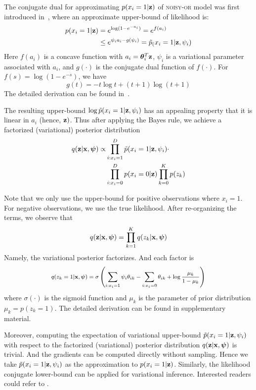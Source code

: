 The conjugate dual for approximating $p(x_i=1|\mathbf{z})$ of \textsc{noisy-or} model was first introduced in~\citep{jaakkola1999variational}, where an approximate upper-bound of likelihood is:
\begin{align}
    p(x_i=1|\mathbf{z}) & =e^{\log (1-e^{-a_i})} = e^{f(a_i)} \nonumber \\
   &  \leq e^{\psi_i a_i - g(\psi_i)} = \Tilde{p}_(x_i=1|\mathbf{z}, \psi_i) 
\label{eq:positiveUB}    
\end{align}
Here $f(a_i)$ is a concave function with $a_i = \bm{\theta}_i^T\mathbf{z}$, $\psi_i$ is a variational parameter associated with $a_i$, and $g(\cdot)$ is the conjugate dual function of $f(\cdot)$. For $f(s) = \log(1-e^{-s})$, we have
\begin{equation}
g(t)  =  -t\log t + (t+1)\log (t+1)
\end{equation}
The detailed derivation can be found in~\citep{jaakkola1999variational}.


The resulting upper-bound $\log \Tilde{p}(x_i=1|\mathbf{z}, \psi_i)$ has an appealing property that it is linear in $a_i$ (hence, $\mathbf{z})$. Thus after applying the Bayes rule, we achieve a factorized (variational) posterior distribution
\begin{align}
    q(\mathbf{z}|\mathbf{x}, \bm{\psi})  \propto 
     &\prod_{i: x_i =1}^D\Tilde{p}(x_i=1|\mathbf{z}, \psi_i) \cdot \nonumber \\
     &\prod_{i: x_i=0}^Dp(x_i=0|\mathbf{z})\prod_{k=0}^K p(z_k)
\label{eq: lvi posterior}
\end{align}


Note that we only use the upper-bound for positive observations where $x_i=1$. For negative observations, we use the true likelihood.  After re-organizing the terms, we observe that
\begin{align}
    q(\mathbf{z}|\mathbf{x}, \bm{\psi}) = \prod_{k=1}^K q(z_k |\mathbf{x}, \bm{\psi})
\end{align}
Namely, the variational posterior factorizes. And each factor is
\begin{align}
    \medmath{q(z_k=1 |\bx, \bpsi) = 
    \sigma\left(\sum_{i:x_i=1}\psi_i\theta_{ik} - \sum_{i:x_i=0}\theta_{ik} + \log \frac{\mu_k}{1-\mu_k}\right)}
\label{eq:factorizedposterior}
\end{align}
where $\sigma(\cdot)$ is the sigmoid function and $\mu_k$ is the parameter of prior distribution $\mu_k = p(z_k=1)$. The detailed derivation can be found in supplementary material.   

Moreover, computing the expectation of variational upper-bound $\Tilde{p}(x_i=1|\mathbf{z}, \psi_i)$ with respect to the factorized (variational) posterior distribution $q(\mathbf{z}|\mathbf{x}, \bm{\psi})$ is trivial. And the gradients can be computed directly without sampling.
Hence we take $\Tilde{p}(x_i=1|\mathbf{z}, \psi_i)$ as the approximation to $p(x_i=1|\mathbf{z})$. 
Similarly, the likelihood conjugate lower-bound can be applied for variational inference. Interested readers could refer to \citep{jaakkola1999variational, vsingliar2006noisy}.

